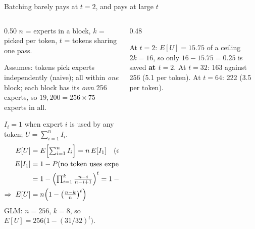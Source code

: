 \documentclass[aspectratio=169]{beamer}
\begin{document}
\begin{frame}{Batching barely pays at $t=2$, and pays at large $t$}

\begin{columns}[T]
\begin{column}{0.50\textwidth}
\footnotesize
\setlength{\abovedisplayskip}{3pt}\setlength{\belowdisplayskip}{3pt}
$n$ = experts in a block, $k$ = picked per token, $t$ = tokens sharing one pass.

\smallskip
Assumes: tokens pick experts independently (naive); all within \emph{one} block; each block has its \emph{own} 256 experts, so $19{,}200 = 256 \times 75$ experts in all.

\smallskip
$I_i = 1$ when expert $i$ is used by any token; $U = \sum_{i=1}^{n} I_i$.
\begin{align*}
E[U] &= E\Bigl[\textstyle\sum_{i=1}^{n} I_i\Bigr] = n\,E[I_1] \quad\text{(experts alike)}\\
E[I_1] &= 1 - P(\text{no token uses expert 1})\\
       &= 1 - \Bigl(\textstyle\prod_{i=1}^{k} \tfrac{n-i}{n-i+1}\Bigr)^{t} = 1 - \bigl(\tfrac{n-k}{n}\bigr)^{t}\\
\Rightarrow\; E[U] &= n\Bigl(1-\bigl(\tfrac{n-k}{n}\bigr)^{t}\Bigr)
\end{align*}
GLM: $n=256$, $k=8$, so $E[U] = 256\bigl(1-(31/32)^{t}\bigr)$.
\end{column}
\begin{column}{0.48\textwidth}
\centering
{}

\raggedright\footnotesize
At $t=2$: $E[U]=15.75$ of a ceiling $2k=16$, so only $16-15.75=0.25$ is saved \textbf{at $t=2$}.
At $t=32$: 163 against 256 (5.1 per token). At $t=64$: 222 (3.5 per token).
\end{column}
\end{columns}

\end{frame}
\end{document}
